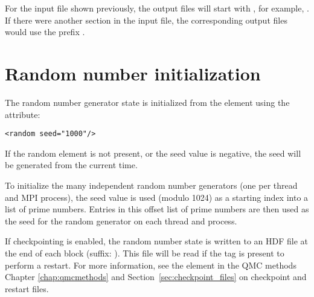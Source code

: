 For the input file shown previously, the output files will start with , for example, .
If there were another  section in the input file, the corresponding output files would use the prefix .



\section{Random number initialization}

The random number generator state is initialized from the  element using the  attribute:
\begin{lstlisting}[style=QMCPXML]
<random seed="1000"/>
\end{lstlisting}

If the random element is not present, or the seed value is negative, the seed will be generated from the current time.

To initialize the many independent random number generators (one per thread and MPI process), the seed value is used (modulo 1024) as a starting index into a list of prime numbers.
Entries in this offset list of prime numbers are then used as the seed for the random generator on each thread and process.

If checkpointing is enabled, the random number state is written to an HDF file at the end of each block (suffix: ).
This file will be read if the  tag is present to perform a restart.
For more information, see the  element in the QMC methods Chapter \ref{chap:qmcmethods} and Section~\ref{sec:checkpoint_files} on checkpoint and restart files.
